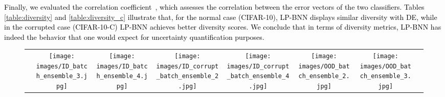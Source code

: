 \documentclass[10pt,twocolumn,letterpaper]{article}
\newcommand\emi{\textcolor{black}}
\newcommand\Gianni{\textcolor{black}}
\newcommand\Isa{\textcolor{black}}
\newcommand{\ab}[1]{\textcolor{black}{#1}}
\begin{document}
\Gianni{Finally, we evaluated the correlation coefficient~\cite{aksela2003comparison}, which assesses \Isa{the correlation between the error vectors of the two classifiers}. Tables \ref{table:diversity} and \ref{table:diversity_c} illustrate that, for the normal case (CIFAR-10), LP-BNN 
\ab{displays similar diversity with DE,} while in the corrupted case (CIFAR-10-C) LP-BNN 
\ab{achieves better diversity scores.} 
\emi{We conclude that} 
\ab{in terms of diversity metrics,} LP-BNN has \emi{indeed} the behavior that one \emi{would} expect \emi{for uncertainty quantification purposes}.
}







\label{subsection5appendix}
\begin{figure*}[!t]
\renewcommand{\captionfont}{\small}

    \centering
    \scalebox{0.85}
{
\begin{tabular}{cccccccc}
\raisebox{7mm}{\large{Input}}
& 
\texttt{[image: images/ID\_batch\_ensemble\_3.jpg]}\label{image1} &
\texttt{[image: images/ID\_batch\_ensemble\_4.jpg]}\label{image2} &
\texttt{[image: images/ID\_corrupt\_batch\_ensemble\_2.jpg]}\label{image4} &
\texttt{[image: images/ID\_corrupt\_batch\_ensemble\_4.jpg]}\label{image4} &
\texttt{[image: images/OOD\_batch\_ensemble\_2.jpg]}\label{image4} &
\texttt{[image: images/OOD\_batch\_ensemble\_3.jpg]}\label{image4} &
\\


\end{tabular}}
\end{figure*}
\end{document}
